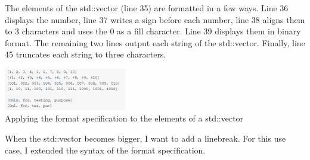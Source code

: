 The elements of the std::vector (line 35) are formatted in a few ways. Line 36 displays the number, line 37 writes a sign before each number, line 38 aligns them to 3 characters and uses the 0 as a fill character. Line 39 displays them in binary format. The remaining two lines output each string of the std::vector. Finally, line 45 truncates each string to three characters.

\begin{center}
\includegraphics[width=0.4\textwidth]{content/3/chapter5/images/1-8.png}\\
Applying the format specification to the elements of a std::vector
\end{center}

When the std::vector becomes bigger, I want to add a linebreak. For this use case, I extended the syntax of the format specification.

